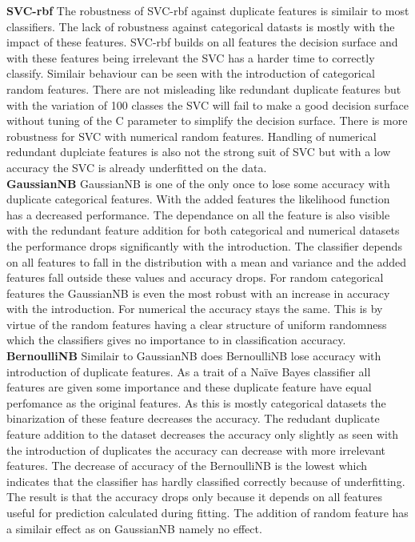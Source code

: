 \documentclass[a4paper,10pt]{article}
\begin{document}
\textbf{SVC-rbf} The robustness of SVC-rbf against duplicate features is similair to most classifiers. The lack of robustness against categorical datasts is mostly with the impact of these features. SVC-rbf builds on all features the decision surface and with these features being irrelevant the SVC has a harder time to correctly classify. Similair behaviour can be seen with the introduction of categorical random features. There are not misleading like redundant duplicate features but with the variation of 100 classes the SVC will fail to make a good decision surface without tuning of the C parameter to simplify the decision surface. There is more robustness for SVC with numerical random features. Handling of numerical redundant duplciate features is also not the strong suit of SVC but with a low accuracy the SVC is already underfitted on the data.  \\

\textbf{GaussianNB} GaussianNB is one of the only once to lose some accuracy with duplicate categorical features. With the added features the likelihood function has a decreased performance. The dependance on all the feature is also visible with the redundant feature addition for both categorical and numerical datasets the performance drops significantly with the introduction. The classifier depends on all features to fall in the distribution with a mean and variance and the added features fall outside these values and accuracy drops. For random categorical features the GaussianNB is even the most robust with an increase in accuracy with the introduction. For numerical the accuracy stays the same. This is by virtue of the random features having a clear structure of uniform randomness which the classifiers gives no importance to in classification accuracy.   \\

\textbf{BernoulliNB} Similair to GaussianNB does BernoulliNB lose accuracy with introduction of duplicate features. As a trait of a Naïve Bayes classifier all features are given some importance and these duplicate feature have equal perfomance as the original features. As this is mostly categorical datasets  the binarization of these feature decreases the accuracy. The redudant duplicate feature addition to the dataset decreases the accuracy only slightly as seen with the introduction of duplicates the accuracy can decrease with more irrelevant features. The decrease of accuracy of the BernoulliNB is the lowest which indicates that the classifier has hardly classified correctly because of underfitting. The result is that the accuracy drops only because it depends on all features useful for prediction calculated during fitting. The addition of random feature has a similair effect as on GaussianNB namely no effect. \\
\end{document}
